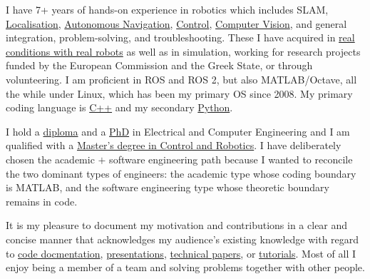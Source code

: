 \documentclass[a4paper,10pt,twoside]{article}
\begin{document}
\vspace{-0.5cm}
\begin{bw_box} \small
  \hspace{1em}I have 7+ years of hands-on experience in robotics which includes SLAM, \href{https://github.com/li9i/fsm-lo}{Localisation},
  \href{https://link.springer.com/article/10.1007/s10846-019-01086-y}{Autonomous Navigation}, \href{https://www.tandfonline.com/doi/full/10.1080/00207179.2018.1514129}{Control},
  \href{https://github.com/li9i/pandora\_vision\_2014}{Computer Vision}, and
  general integration, problem-solving, and troubleshooting. These I have acquired in \href{https://relief.web.auth.gr/\%CF\%81\%CE\%BF\%CE\%BC\%CF\%80\%CE\%BF\%CF\%84\%CE\%B9\%CE\%BA\%CE\%AC-\%CE\%BF\%CF\%87\%CE\%AE\%CE\%BC\%CE\%B1\%CF\%84\%CE\%B1/}{real
  conditions with real robots} as well as in simulation, working for research
  projects funded by the European Commission and the Greek State, or through volunteering. I am proficient in ROS and ROS 2, but also MATLAB/Octave, all the while under Linux, which has been my primary OS since 2008. My
  primary coding language is \href{https://github.com/li9i/fsm}{C++} and my
  secondary
  \href{https://github.com/cultureid-auth-ros-packages/cultureid-waypoints-following}{Python}.

  \hspace{1em}I hold a \href{https://ikee.lib.auth.gr/record/291560}{diploma} and a \href{https://ikee.lib.auth.gr/record/354644}{PhD} in Electrical and Computer Engineering and I
  am qualified with a
  \href{http://kth.diva-portal.org/smash/record.jsf?pid=diva2\%3A1102597\&dswid=2875}{Master's degree in Control and Robotics}.
  I have deliberately chosen the academic $+$ software engineering path because I
  wanted to reconcile the two dominant types of engineers: the academic type
  whose coding boundary is MATLAB, and the software engineering type whose
  theoretic boundary remains in code.

  \hspace{1em}It is my pleasure to document my motivation and contributions in a clear and concise
  manner that acknowledges my audience's existing knowledge with regard to
  \href{https://github.com/li9i/pandora_vision_2014/blob/hydro-devel/pandora_vision_hole_detector/src/hole_fusion_node/hole_fusion.cpp}{code docmentation},
  \href{https://www.youtube.com/watch?v=xaDKjI0WkDc}{presentations}, \href{https://ieeexplore.ieee.org/abstract/document/9981228}{technical papers},
  or \href{https://github.com/li9i/ros1_humble_bridge_template}{tutorials}. Most of all I enjoy being a member of a team and solving problems together with other people.
\end{bw_box}
\vfill
\end{document}

